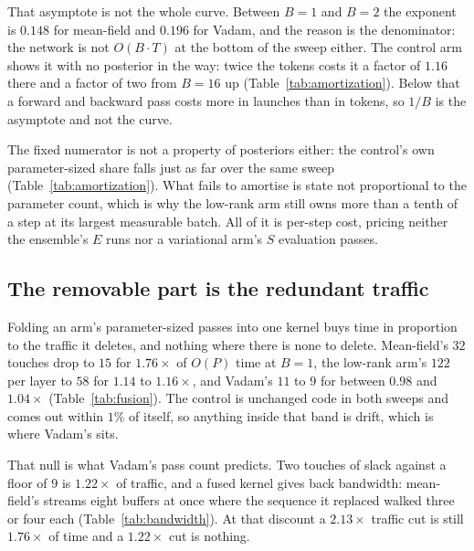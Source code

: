That asymptote is not the whole curve. Between $B = 1$ and $B = 2$ the exponent is
$0.148$ for mean-field and $0.196$ for Vadam, and the reason is the denominator: the
network is not $O(B \cdot T)$ at the bottom of the sweep either. The control arm
shows it with no posterior in the way: twice the tokens costs it a factor of $1.16$
there and a factor of two from $B = 16$ up (Table~\ref{tab:amortization}). Below that
a forward and backward pass costs more in launches than in tokens, so $1/B$ is the
asymptote and not the curve.

The fixed numerator is not a property of posteriors either: the control's own
parameter-sized share falls just as far over the same sweep
(Table~\ref{tab:amortization}). What fails to amortise is state not proportional to
the parameter count, which is why the low-rank arm still owns more than a tenth of a
step at its largest measurable batch. All of it is per-step cost, pricing neither the
ensemble's $E$ runs nor a variational arm's $S$ evaluation passes.

\begin{table}[t]
  \centering
  \resizebox{\linewidth}{!}{}
  \caption{The batch sweep for the shipped code. $O(P)\%$ is all parameter-sized work
  over the step, Bayesian or not. The ensemble column is one member, no posterior.}
  \label{tab:amortization}
\end{table}

\subsection{The removable part is the redundant traffic}
\label{sec:cost:fusion}

Folding an arm's parameter-sized passes into one kernel buys time in proportion to the
traffic it deletes, and nothing where there is none to delete. Mean-field's $32$
touches drop to $15$ for $1.76\times$ of $O(P)$ time at $B = 1$, the low-rank arm's
$122$ per layer to $58$ for $1.14$ to $1.16\times$, and Vadam's $11$ to $9$ for
between $0.98$ and $1.04\times$
(Table~\ref{tab:fusion}). The control is unchanged code in both sweeps and comes out
within $1\%$ of itself, so anything inside that band is drift, which is where
Vadam's sits.

That null is what Vadam's pass count predicts. Two touches of slack against a floor
of $9$ is $1.22\times$ of traffic, and a fused kernel gives back bandwidth:
mean-field's streams eight buffers at once where the sequence it replaced walked three
or four each (Table~\ref{tab:bandwidth}). At that discount a $2.13\times$ traffic cut
is still $1.76\times$ of time and a $1.22\times$ cut is nothing.

